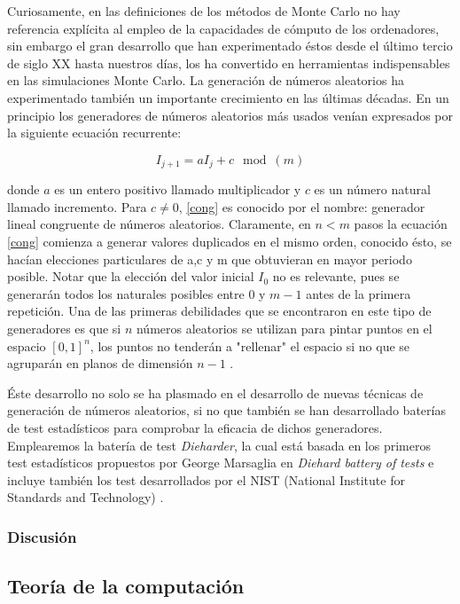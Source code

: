 \documentclass[../proyecto.tex]{memoir}
\begin{document}
Curiosamente, en las definiciones de los métodos de Monte Carlo no hay referencia explícita al empleo de la capacidades de cómputo de los ordenadores, sin embargo el gran desarrollo que han experimentado éstos desde el último tercio de siglo XX hasta nuestros días, los ha convertido en herramientas indispensables en las simulaciones Monte Carlo. La generación de números aleatorios ha experimentado también un importante crecimiento en las últimas décadas. En un principio los generadores de números aleatorios  más usados venían expresados por la siguiente ecuación recurrente:

\begin{equation} \label{cong}
I_{j+1} = aI_{j} +c \mod (m)
\end{equation}

donde $a$ es un entero positivo llamado multiplicador y $c$ es un número natural llamado incremento. Para $c \neq 0$, \ref{cong} es conocido por el nombre: generador lineal congruente de números aleatorios. Claramente, en $n<m$ pasos la ecuación \ref{cong} comienza a generar valores duplicados en el mismo orden, conocido ésto, se hacían elecciones particulares de a,c y m que obtuvieran en mayor periodo posible. Notar que la elección del valor inicial $I_{0}$ no es relevante, pues se generarán todos los naturales posibles entre $0$ y $m-1$ antes de la primera repetición. Una de las primeras debilidades que se encontraron en este tipo de generadores es que si $n$ números aleatorios se utilizan para pintar puntos en el espacio $[0,1]^{n}$, los puntos no tenderán a "rellenar" el espacio si no que se agruparán en planos de dimensión $n-1$ \cite{planos}. 

Éste desarrollo no solo se ha plasmado en el desarrollo de nuevas técnicas de generación de números aleatorios, si no que también se han desarrollado baterías de test estadísticos para comprobar la eficacia de dichos generadores. Emplearemos la batería de test \textit{Dieharder}, la cual está basada en los primeros test estadísticos propuestos por George Marsaglia en \textit{Diehard battery of tests} e incluye también los test desarrollados por el NIST (National Institute for Standards and Technology) \cite{dieharder}.

\subsubsection{Discusión}



\subsection{Teoría de la computación}
\end{document}
